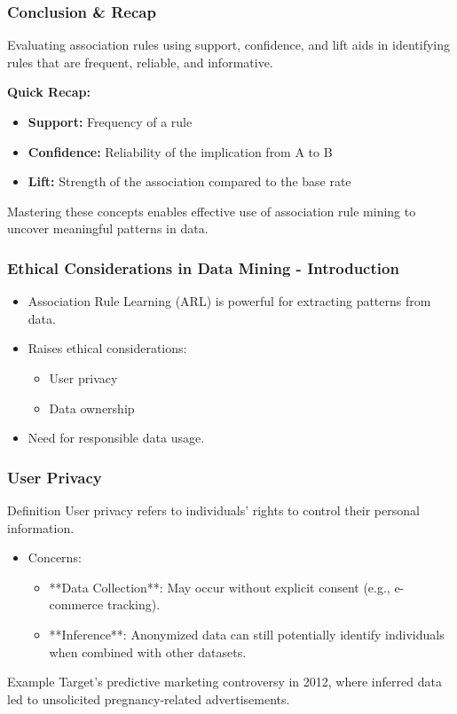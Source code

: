 \documentclass{beamer}
\begin{document}
\begin{frame}[fragile]
    \frametitle{Conclusion & Recap}
    Evaluating association rules using support, confidence, and lift aids in identifying rules that are frequent, reliable, and informative. 

    \textbf{Quick Recap:}
    \begin{itemize}
        \item \textbf{Support:} Frequency of a rule
        \item \textbf{Confidence:} Reliability of the implication from A to B
        \item \textbf{Lift:} Strength of the association compared to the base rate
    \end{itemize}

    Mastering these concepts enables effective use of association rule mining to uncover meaningful patterns in data.
\end{frame}

\begin{frame}[fragile]
    \frametitle{Ethical Considerations in Data Mining - Introduction}
    \begin{itemize}
        \item Association Rule Learning (ARL) is powerful for extracting patterns from data.
        \item Raises ethical considerations:
        \begin{itemize}
            \item User privacy
            \item Data ownership
        \end{itemize}
        \item Need for responsible data usage.
    \end{itemize}
\end{frame}

\begin{frame}[fragile]
    \frametitle{User Privacy}
    \begin{block}{Definition}
        User privacy refers to individuals' rights to control their personal information.
    \end{block}
    \begin{itemize}
        \item Concerns:
        \begin{itemize}
            \item **Data Collection**: May occur without explicit consent (e.g., e-commerce tracking).
            \item **Inference**: Anonymized data can still potentially identify individuals when combined with other datasets.
        \end{itemize}
    \end{itemize}
    
    \begin{block}{Example}
        Target's predictive marketing controversy in 2012, where inferred data led to unsolicited pregnancy-related advertisements.
    \end{block}
\end{frame}
\end{document}
